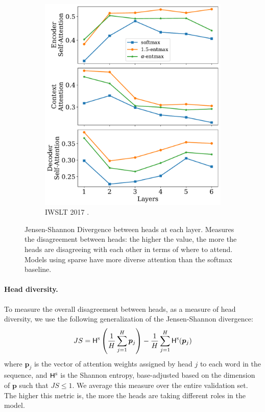 \begin{figure}[!htbp]
\begin{subfigure}[b]{.49\linewidth}
        \includegraphics[width=\linewidth]{Figures/js_divs_de.pdf}
        \caption{%
            \label{fig:js_divs_de}%
            IWSLT 2017 .}
    \end{subfigure}
    \caption{%
        \label{fig:js_divs}
        Jensen-Shannon Divergence between heads at each layer. Measures the
        disagreement between heads: the higher the value, the more the heads
        are disagreeing with each other in terms of where to attend. Models
        using sparse \entmaxtext have more diverse attention than the softmax
        baseline.
    }
\end{figure}

\paragraph*{Head diversity.} To measure the overall disagreement
between heads, as a measure of head diversity, we use the
following generalization of the Jensen-Shannon divergence:
%
\begin{equation}
    JS = \mathsf{H}^{\textsc{s}}\left(\frac{1}{H}\sum_{j=1}^H \bm{p}_{j}\right) -
    \frac{1}{H}\sum_{j=1}^{H}
    \mathsf{H}^{\textsc{s}}(\bm{p}_j)
\end{equation}
%
where $\bm{p}_j$ is the vector of attention weights assigned by head
$j$ to each word in the sequence, and $\mathsf{H}^{\textsc{s}}$ is the Shannon entropy,
base-adjusted based on the dimension of $\bm{p}$ such that $JS \leq
    1$. We average this measure over the entire validation set. The
higher this metric is, the more the heads are taking different roles
in the model.

